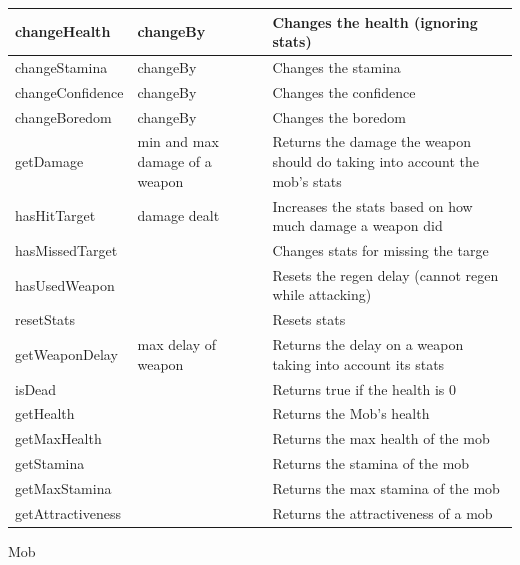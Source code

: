 \documentclass[../../Main.tex]{subfiles}
\begin{document}
\begin{center}
\begin{tabular}{ | m{} | m{}| m{} | }
            \hline
            changeHealth & changeBy & Changes the health (ignoring stats) \\
            \hline
            changeStamina & changeBy & Changes the stamina \\
            \hline
            changeConfidence & changeBy & Changes the confidence \\
            \hline
            changeBoredom & changeBy & Changes the boredom \\
            \hline
            getDamage & min and max damage of a weapon & Returns the damage the weapon should do taking into account the mob's stats \\
            \hline
            hasHitTarget & damage dealt & Increases the stats based on how much damage a weapon did \\
            \hline
            hasMissedTarget & & Changes stats for missing the targe \\
            \hline
            hasUsedWeapon & & Resets the regen delay (cannot regen while attacking) \\
            \hline
            resetStats & & Resets stats \\
            \hline
            getWeaponDelay & max delay of weapon & Returns the delay on a weapon taking into account its stats \\
            \hline
            isDead & & Returns true if the health is 0 \\
            \hline
            getHealth & & Returns the Mob's health \\
            \hline
            getMaxHealth & & Returns the max health of the mob \\
            \hline
            getStamina & & Returns the stamina of the mob \\
            \hline
            getMaxStamina & & Returns the max stamina of the mob \\
            \hline
            getAttractiveness & & Returns the attractiveness of a mob \\
            \hline
        \end{tabular}
    \end{center}
    Mob
\end{document}
